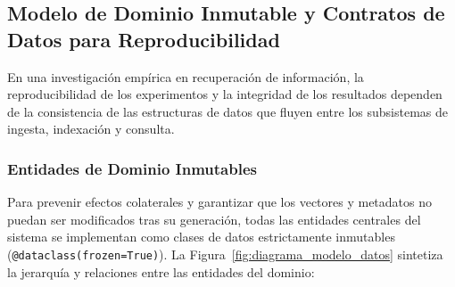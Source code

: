 \subsection{Modelo de Dominio Inmutable y Contratos de Datos para Reproducibilidad}
\label{subsec:modelo_datos_inmutable}

En una investigación empírica en recuperación de información, la reproducibilidad de los experimentos y la integridad de los resultados dependen de la consistencia de las estructuras de datos que fluyen entre los subsistemas de ingesta, indexación y consulta. 

\subsubsection{Entidades de Dominio Inmutables}
Para prevenir efectos colaterales y garantizar que los vectores y metadatos no puedan ser modificados tras su generación, todas las entidades centrales del sistema se implementan como clases de datos estrictamente inmutables (\texttt{@dataclass(frozen=True)}). La Figura~\ref{fig:diagrama_modelo_datos} sintetiza la jerarquía y relaciones entre las entidades del dominio:

